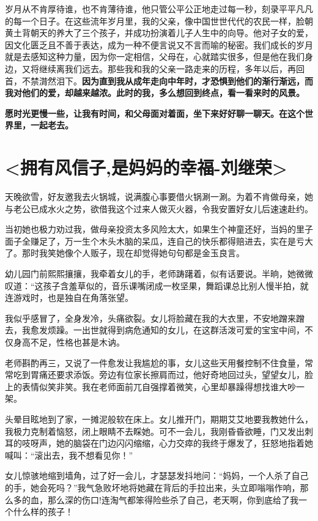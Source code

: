 \documentclass[UTF8,a4paper,8pt]{ctexbook}
\begin{document}
		岁月从不肯厚待谁，也不肯薄待谁，他只管公平公正地走过每一秒，刻录平平凡凡的每一个日子。在这些流年岁月里，我的父亲，像中国世世代代的农民一样，脸朝黄土背朝天的养大了三个孩子，并成功扮演着儿子人生中的向导。他对子女的爱，因文化匮乏且不善于表达，成为一种不便言说又不言而喻的秘密。我们成长的岁月就是去感知这种力量，因为你一定相信，父母在，心就踏实很多，但是他在我们身边，又将继续离我们远去。那些我和我的父亲一路走来的历程，多年以后，再回首，不禁潸然泪下。\textbf{因为直到我从成年走向中年时，才恐惧到他们的渐行渐远，而我对他们的爱，却越来越浓。此时的我，多么想回到终点，看一看来时的风景。}
		
		\textbf{愿时光更慢一些，让我有时间，和父母面对着面，坐下来好好聊一聊天。在这个世界里，一起老去。}
		
		
\newpage
\section{<拥有风信子,是妈妈的幸福-刘继荣>}
		天晚欲雪，好友邀我去火锅城，说满腹心事要借火锅涮一涮。为着不肯做母亲，她与老公已成水火之势，欲借我这个过来人做灭火器，令我安置好女儿后速速赴约。
		
		当初她也极力劝过我，做母亲投资太多风险太大，如果生个神童还好，当妈的里子面子全赚足了，万一生个木头木脑的呆瓜，连自己的快乐都得赔进去，实在是亏大了。那时我笑她像个人贩子，现在却觉得她句句都是金玉良言。
		
		幼儿园门前熙熙攘攘，我牵着女儿的手，老师踌躇着，似有话要说。半晌，她微微叹道：“这孩子含羞草似的，音乐课嘴闭成一枚坚果，舞蹈课总比别人慢半拍，就连游戏时，也是独自在角落张望。
		
		我似乎感冒了，全身发冷，头痛欲裂。女儿将脸藏在我的大衣里，不安地蹭来蹭去，我愈发烦躁。一出世就得到病危通知的女儿，在这群活泼可爱的宝宝中间，不仅身高不足，性格也甚是木讷。
		
		老师斟酌再三，又说了一件愈发让我尴尬的事，女儿这些天用餐控制不住食量，常常吃到胃痛还要求添饭。旁边有位家长擦肩而过，他好奇地回过头，望望女儿，脸上的表情似笑非笑。我在老师面前兀自强撑着微笑，心里却暴躁得想找谁大吵一架。
		
		头晕目眩地到了家，一摊泥般软在床上。女儿推开门，期期艾艾地要我教她什么，我极力克制着恼怒，闭上眼睛不去睬她。可不一会儿，我刚昏昏欲睡，门又发出刺耳的吱呀声，她的脑袋在门边闪闪缩缩，心力交瘁的我终于爆发了，狂怒地指着她喊叫：“滚出去，我不想看见你！”
		
		女儿惊骇地缩到墙角，过了好一会儿，才瑟瑟发抖地问：“妈妈，一个人杀了自己的手，她会死吗？”我气急败坏地将她藏在背后的手拉出来，头立即嗡嗡作响，那么多的血，那么深的伤口!连淘气都笨得险些杀了自己，老天啊，你到底给了我一个什么样的孩子！
		
\end{document}
